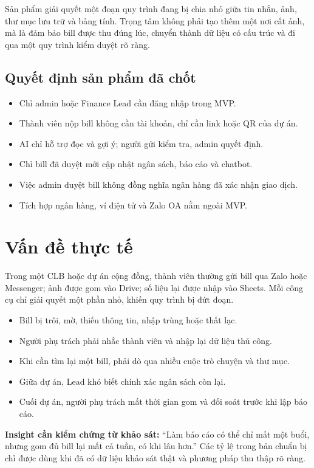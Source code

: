 \documentclass[a4paper,11pt]{article}
\begin{document}
Sản phẩm giải quyết một đoạn quy trình đang bị chia nhỏ giữa tin nhắn, ảnh, thư mục lưu trữ và bảng tính. Trọng tâm không phải tạo thêm một nơi cất ảnh, mà là đảm bảo bill được thu đúng lúc, chuyển thành dữ liệu có cấu trúc và đi qua một quy trình kiểm duyệt rõ ràng.

\subsection{Quyết định sản phẩm đã chốt}

\begin{itemize}
  \item Chỉ admin hoặc Finance Lead cần đăng nhập trong MVP.
  \item Thành viên nộp bill không cần tài khoản, chỉ cần link hoặc QR của dự án.
  \item AI chỉ hỗ trợ đọc và gợi ý; người gửi kiểm tra, admin quyết định.
  \item Chỉ bill đã duyệt mới cập nhật ngân sách, báo cáo và chatbot.
  \item Việc admin duyệt bill không đồng nghĩa ngân hàng đã xác nhận giao dịch.
  \item Tích hợp ngân hàng, ví điện tử và Zalo OA nằm ngoài MVP.
\end{itemize}

\section{Vấn đề thực tế}

Trong một CLB hoặc dự án cộng đồng, thành viên thường gửi bill qua Zalo hoặc Messenger; ảnh được gom vào Drive; số liệu lại được nhập vào Sheets. Mỗi công cụ chỉ giải quyết một phần nhỏ, khiến quy trình bị đứt đoạn.

\begin{itemize}
  \item Bill bị trôi, mờ, thiếu thông tin, nhập trùng hoặc thất lạc.
  \item Người phụ trách phải nhắc thành viên và nhập lại dữ liệu thủ công.
  \item Khi cần tìm lại một bill, phải dò qua nhiều cuộc trò chuyện và thư mục.
  \item Giữa dự án, Lead khó biết chính xác ngân sách còn lại.
  \item Cuối dự án, người phụ trách mất thời gian gom và đối soát trước khi lập báo cáo.
\end{itemize}

\begin{warningbox}
\textbf{Insight cần kiểm chứng từ khảo sát:} “Làm báo cáo có thể chỉ mất một buổi, nhưng gom đủ bill lại mất cả tuần, có khi lâu hơn.” Các tỷ lệ trong bản chuẩn bị chỉ được dùng khi đã có dữ liệu khảo sát thật và phương pháp thu thập rõ ràng.
\end{warningbox}
\end{document}
